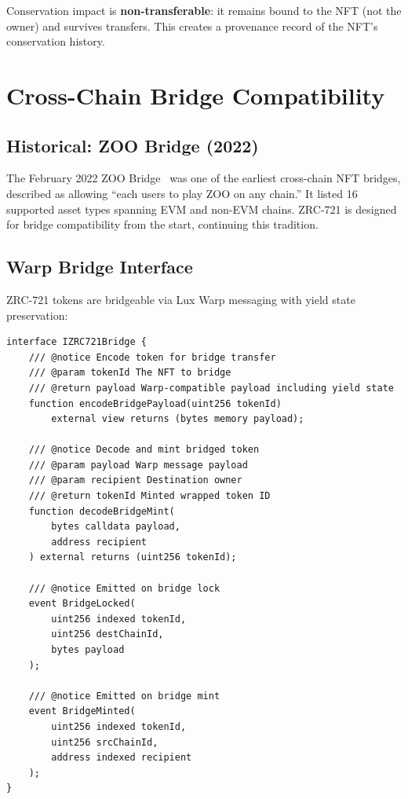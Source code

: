 \documentclass[11pt,letterpaper]{article}
\begin{document}
Conservation impact is \textbf{non-transferable}: it remains bound to the NFT (not the owner) and survives transfers. This creates a provenance record of the NFT's conservation history.

\section{Cross-Chain Bridge Compatibility}
\label{sec:bridge}

\subsection{Historical: ZOO Bridge (2022)}

The February 2022 ZOO Bridge~\cite{zoo-jan-2022-deck} was one of the earliest cross-chain NFT bridges, described as allowing ``each users to play ZOO on any chain.'' It listed 16 supported asset types spanning EVM and non-EVM chains. ZRC-721 is designed for bridge compatibility from the start, continuing this tradition.

\subsection{Warp Bridge Interface}

ZRC-721 tokens are bridgeable via Lux Warp messaging with yield state preservation:

\begin{lstlisting}[language=Solidity,caption=ZRC-721 Bridge Interface]
interface IZRC721Bridge {
    /// @notice Encode token for bridge transfer
    /// @param tokenId The NFT to bridge
    /// @return payload Warp-compatible payload including yield state
    function encodeBridgePayload(uint256 tokenId)
        external view returns (bytes memory payload);

    /// @notice Decode and mint bridged token
    /// @param payload Warp message payload
    /// @param recipient Destination owner
    /// @return tokenId Minted wrapped token ID
    function decodeBridgeMint(
        bytes calldata payload,
        address recipient
    ) external returns (uint256 tokenId);

    /// @notice Emitted on bridge lock
    event BridgeLocked(
        uint256 indexed tokenId,
        uint256 destChainId,
        bytes payload
    );

    /// @notice Emitted on bridge mint
    event BridgeMinted(
        uint256 indexed tokenId,
        uint256 srcChainId,
        address indexed recipient
    );
}
\end{lstlisting}
\end{document}
